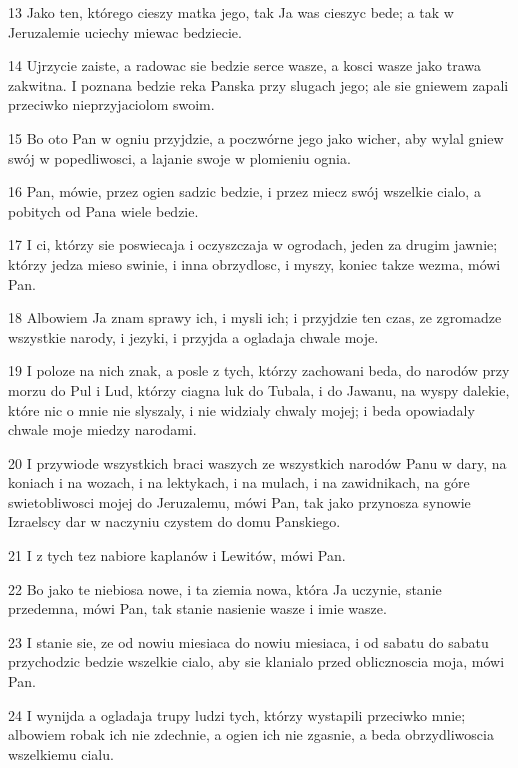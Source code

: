 \par 13 Jako ten, którego cieszy matka jego, tak Ja was cieszyc bede; a tak w Jeruzalemie uciechy miewac bedziecie.
\par 14 Ujrzycie zaiste, a radowac sie bedzie serce wasze, a kosci wasze jako trawa zakwitna. I poznana bedzie reka Panska przy slugach jego; ale sie gniewem zapali przeciwko nieprzyjaciolom swoim.
\par 15 Bo oto Pan w ogniu przyjdzie, a poczwórne jego jako wicher, aby wylal gniew swój w popedliwosci, a lajanie swoje w plomieniu ognia.
\par 16 Pan, mówie, przez ogien sadzic bedzie, i przez miecz swój wszelkie cialo, a pobitych od Pana wiele bedzie.
\par 17 I ci, którzy sie poswiecaja i oczyszczaja w ogrodach, jeden za drugim jawnie; którzy jedza mieso swinie, i inna obrzydlosc, i myszy, koniec takze wezma, mówi Pan.
\par 18 Albowiem Ja znam sprawy ich, i mysli ich; i przyjdzie ten czas, ze zgromadze wszystkie narody, i jezyki, i przyjda a ogladaja chwale moje.
\par 19 I poloze na nich znak, a posle z tych, którzy zachowani beda, do narodów przy morzu do Pul i Lud, którzy ciagna luk do Tubala, i do Jawanu, na wyspy dalekie, które nic o mnie nie slyszaly, i nie widzialy chwaly mojej; i beda opowiadaly chwale moje miedzy narodami.
\par 20 I przywiode wszystkich braci waszych ze wszystkich narodów Panu w dary, na koniach i na wozach, i na lektykach, i na mulach, i na zawidnikach, na góre swietobliwosci mojej do Jeruzalemu, mówi Pan, tak jako przynosza synowie Izraelscy dar w naczyniu czystem do domu Panskiego.
\par 21 I z tych tez nabiore kaplanów i Lewitów, mówi Pan.
\par 22 Bo jako te niebiosa nowe, i ta ziemia nowa, która Ja uczynie, stanie przedemna, mówi Pan, tak stanie nasienie wasze i imie wasze.
\par 23 I stanie sie, ze od nowiu miesiaca do nowiu miesiaca, i od sabatu do sabatu przychodzic bedzie wszelkie cialo, aby sie klanialo przed oblicznoscia moja, mówi Pan.
\par 24 I wynijda a ogladaja trupy ludzi tych, którzy wystapili przeciwko mnie; albowiem robak ich nie zdechnie, a ogien ich nie zgasnie, a beda obrzydliwoscia wszelkiemu cialu.


